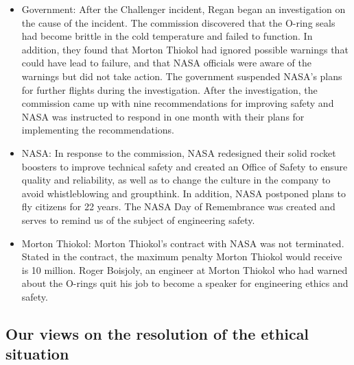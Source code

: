 \documentclass{article}
\begin{document}
\begin{itemize}

\item
Government:
After the Challenger incident, Regan began an investigation on the cause of the incident. The commission discovered that the O-ring seals had become brittle in the cold temperature and failed to function. In addition, they found that Morton Thiokol had ignored possible warnings that could have lead to failure, and that NASA officials were aware of the warnings but did not take action. The government suspended NASA's plans for further flights during the investigation. After the investigation, the commission came up with nine recommendations for improving safety and NASA was instructed to respond in one month with their plans for implementing the recommendations.

\item
NASA:
In response to the commission, NASA redesigned their solid rocket boosters to improve technical safety and created an Office of Safety to ensure quality and reliability, as well as to change the culture in the company to avoid whistleblowing and groupthink. In addition, NASA postponed plans to fly citizens for 22 years. The NASA Day of Remembrance was created and serves to remind us of the subject of engineering safety.

\item
Morton Thiokol:
Morton Thiokol's contract with NASA was not terminated. Stated in the contract, the maximum penalty Morton Thiokol would receive is 10 million.
Roger Boisjoly, an engineer at Morton Thiokol who had warned about the O-rings quit his job to become a speaker for engineering ethics and safety.
\end{itemize}

\vspace{10pt}
\subsection{Our views on the resolution of the ethical situation}
\end{document}
